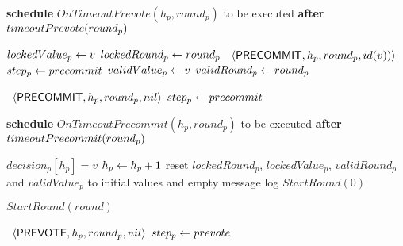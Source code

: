 \begin{algorithm}[htb!]
\begin{algorithmic}[1]
		\SPACE 
		\label{line:tab:recvAny2/3Prevote} 
		\STATE \textbf{schedule} $OnTimeoutPrevote(h_p, round_p)$ to be executed \textbf{after}  $timeoutPrevote(round_p)$ \label{line:tab:timeoutPrevote} 
		\ENDUPON
		
		\SPACE 
		\label{line:tab:recvPrevote} 
			\STATE $lockedValue_p \leftarrow v$                \label{line:tab:setLockedValue} 
			\STATE $lockedRound_p \leftarrow round_p$   \label{line:tab:setLockedRound} 
			\STATE \Broadcast \ $\langle\mathsf{PRECOMMIT},h_p,round_p,id(v))\rangle$  
			\label{line:tab:precommit-v}	
			\STATE $step_p \leftarrow precommit$ \label{line:tab:setStateToCommit} 
		\ENDIF 
		\STATE $validValue_p \leftarrow v$ \label{line:tab:setValidRound} 
		\STATE $validRound_p \leftarrow round_p$ \label{line:tab:setValidValue} 
		\ENDUPON
		
		\SHORTSPACE 
			\STATE \Broadcast \ $\langle\mathsf{PRECOMMIT},h_p,round_p, nil\rangle$
			\label{line:tab:precommit-v-1} 
			\STATE $step_p \leftarrow precommit$ 
		\ENDUPON
		
		\SPACE 
		\label{line:tab:startTimeoutPrecommit} 
			\STATE \textbf{schedule} $OnTimeoutPrecommit(h_p, round_p)$ to be executed \textbf{after} $timeoutPrecommit(round_p)$ 
			 
		\ENDUPON 
		
		\SPACE 
		\label{line:tab:onDecideRule} 
			 \label{line:tab:validDecisionValue} 
				\STATE $decision_p[h_p] = v$ \label{line:tab:decide} 
				\STATE$h_p \leftarrow h_p + 1$ \label{line:tab:increaseHeight} 
				\STATE reset $lockedRound_p$, $lockedValue_p$, $validRound_p$ and $validValue_p$ to initial values 
				and empty message log 
				\STATE $StartRound(0)$   	
			\ENDIF 
		\ENDUPON
		
		\SHORTSPACE 
		\label{line:tab:skipRounds} 
			\STATE $StartRound(round)$ \label{line:tab:nextRound2} 
		\ENDUPON
		
		\SHORTSPACE 
		 \label{line:tab:onTimeoutPropose} 
			\STATE \Broadcast \ $\langle\mathsf{PREVOTE},h_p,round_p, nil\rangle$ 
		 	\label{line:tab:prevote-nil-on-timeout}	
		 	\STATE $step_p \leftarrow prevote$ 
		 \ENDIF	
		 \ENDFUNCTION
		

\end{algorithmic}
\end{algorithm}
